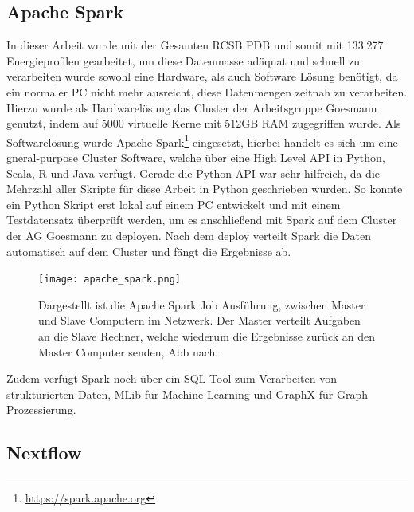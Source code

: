 \subsection{Apache Spark}
In dieser Arbeit wurde mit der Gesamten RCSB \ac{PDB} und somit mit 133.277 Energieprofilen gearbeitet, um diese Datenmasse adäquat und schnell zu verarbeiten wurde sowohl eine Hardware, als auch Software Lösung benötigt, da ein normaler PC nicht mehr ausreicht, diese Datenmengen zeitnah zu verarbeiten. Hierzu wurde als Hardwarelösung das Cluster der Arbeitsgruppe Goesmann genutzt, indem auf 5000 virtuelle Kerne mit 512GB RAM zugegriffen wurde. Als Softwarelösung wurde Apache Spark\footnote{\url{https://spark.apache.org}} eingesetzt, hierbei handelt es sich um eine gneral-purpose Cluster Software, welche über eine High Level API in Python, Scala, R und Java verfügt. Gerade die Python API war sehr hilfreich, da die Mehrzahl aller Skripte für diese Arbeit in Python geschrieben wurden. So konnte ein Python Skript erst lokal auf einem PC entwickelt und mit einem Testdatensatz überprüft werden, um es anschließend mit Spark auf dem Cluster der AG Goesmann zu deployen. Nach dem deploy verteilt Spark die Daten automatisch auf dem Cluster und fängt die Ergebnisse ab. 

\begin{figure}
\texttt{[image: apache\_spark.png]}
\caption{Dargestellt ist die Apache Spark Job Ausführung, zwischen Master und Slave Computern im Netzwerk. Der Master verteilt Aufgaben an die Slave Rechner, welche wiederum die Ergebnisse zurück an den Master Computer senden, \ac{Abb} nach\protect\footnotemark.}
\label{fig:apache_spark}
\end{figure}

Zudem verfügt Spark noch über ein SQL Tool zum Verarbeiten von strukturierten Daten, MLib für Machine Learning und GraphX für Graph Prozessierung.




\newpage
\subsection{Nextflow}

